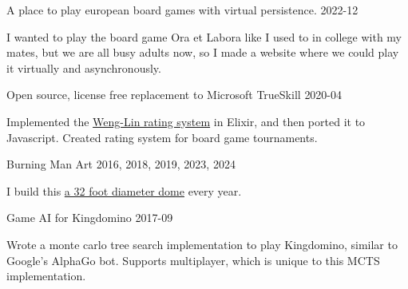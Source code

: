 \documentclass[11pt,english]{article}
\begin{document}
\begin{description}
\squish

           {A place to play european board games with virtual persistence.}
           {2022-12}

I wanted to play the board game Ora et Labora like I used to in college with my mates, but we are all busy adults now, so I made a website where we could play it virtually and asynchronously.

           {Open source, license free replacement to Microsoft TrueSkill}
           {2020-04}

Implemented the \href{https://www.csie.ntu.edu.tw/~cjlin/papers/online_ranking/online_journal.pdf}{Weng-Lin rating system} in Elixir, and then ported it to Javascript. Created rating system for board game tournaments.

           {Burning Man Art}
           {2016, 2018, 2019, 2023, 2024}

I build this \href{https://www.instagram.com/p/B2CdlKqnNXD/}{a 32 foot diameter dome} every year.

           {Game AI for Kingdomino}
           {2017-09}

Wrote a monte carlo tree search implementation to play Kingdomino, similar to
Google's AlphaGo bot. Supports multiplayer, which is unique to this MCTS
implementation.

\end{description}
\end{document}
